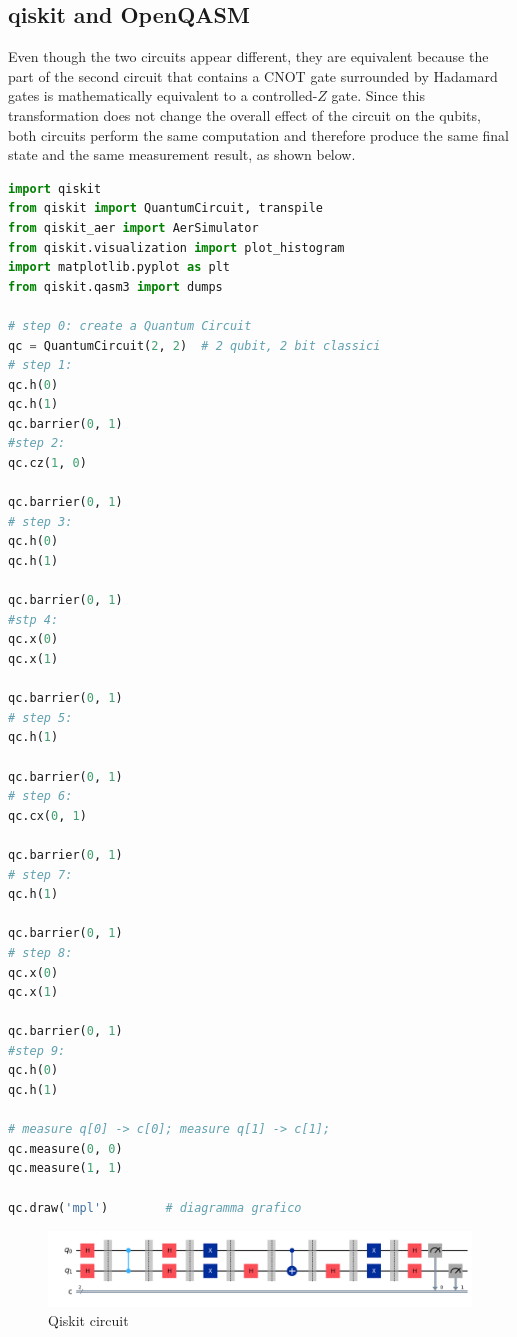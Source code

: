 \subsection{qiskit and OpenQASM}
Even though the two circuits appear different, they are equivalent because the part of the second circuit that contains a CNOT gate surrounded by Hadamard gates is mathematically equivalent to a controlled-$Z$ gate. Since this transformation does not change the overall effect of the circuit on the qubits, both circuits perform the same computation and therefore produce the same final state and the same measurement result, as shown below.

\begin{lstlisting}[language=Python, caption={Qiskit code}, label={lst:qiskit-circuit}]
import qiskit
from qiskit import QuantumCircuit, transpile
from qiskit_aer import AerSimulator
from qiskit.visualization import plot_histogram
import matplotlib.pyplot as plt
from qiskit.qasm3 import dumps

# step 0: create a Quantum Circuit
qc = QuantumCircuit(2, 2)  # 2 qubit, 2 bit classici
# step 1:
qc.h(0)
qc.h(1)
qc.barrier(0, 1)
#step 2:
qc.cz(1, 0)

qc.barrier(0, 1)
# step 3:
qc.h(0)
qc.h(1)

qc.barrier(0, 1)
#stp 4:
qc.x(0)
qc.x(1)

qc.barrier(0, 1)
# step 5:
qc.h(1)

qc.barrier(0, 1)
# step 6:
qc.cx(0, 1)

qc.barrier(0, 1)
# step 7:
qc.h(1)

qc.barrier(0, 1)
# step 8:
qc.x(0)
qc.x(1)

qc.barrier(0, 1)
#step 9:
qc.h(0)
qc.h(1)

# measure q[0] -> c[0]; measure q[1] -> c[1];
qc.measure(0, 0)
qc.measure(1, 1)

qc.draw('mpl')        # diagramma grafico
\end{lstlisting}



\begin{figure}[H]
    \centering
    \includegraphics[width=1\textwidth]{images/circuit_es4.png}
    \caption{Qiskit circuit}
    \label{fig:circuit es4}
\end{figure}




